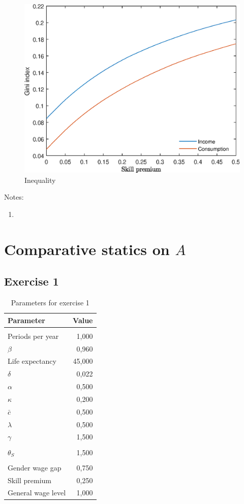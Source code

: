 \documentclass[12pt]{article}
\begin{document}
\begin{figure}
	\centering
	\caption{Inequality}
	\includegraphics{Graphs/ineq_skill_premium_ex1.eps}
\end{figure}

Notes:

\begin{enumerate}
	\item 
\end{enumerate}

\clearpage

\section{Comparative statics on $A$}

\subsection{Exercise 1}

\begin{table}[htbp]
	\centering
	\caption{Parameters for exercise 1}
	\begin{tabular}{lr}
		\toprule
		Parameter & \multicolumn{1}{l}{Value} \\
		\midrule
		&  \\
		Periods per year & 1,000 \\
		$\beta$ & 0,960 \\
		Life expectancy & 45,000 \\
		$\delta$ & 0,022 \\
		$\alpha$ & 0,500 \\
		$\kappa$ & 0,200 \\
		$\bar {c}$ & 0,500 \\
		$\lambda$ & 0,500 \\
		$\gamma$ & 1,500 \\
		&  \\
		$\theta_S$ & 1,500 \\
		&  \\
		Gender wage gap & 0,750 \\
		Skill premium & 0,250 \\
		General wage level & 1,000 \\
		\bottomrule
	\end{tabular}
\end{table}
\end{document}
